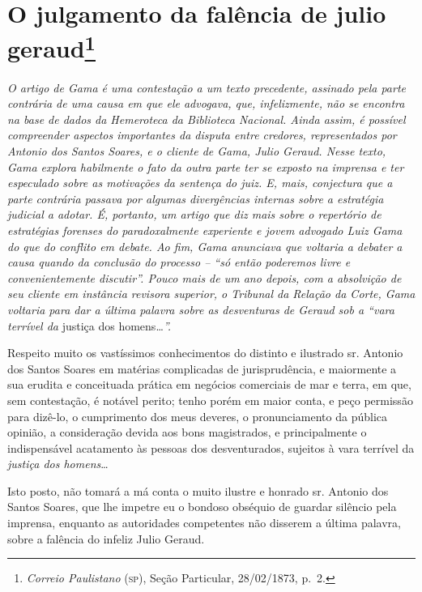 \chapter{O julgamento da falência de julio geraud\footnote{\emph{Correio Paulistano} (\textsc{sp}), Seção Particular,
  28/02/1873, p.~2.}} %

\begin{didascalia}
\emph{O artigo de Gama é uma contestação a um texto precedente, assinado
pela parte contrária de uma causa em que ele advogava, que,
infelizmente, não se encontra na base de dados da Hemeroteca da
Biblioteca Nacional. Ainda assim, é possível compreender aspectos
importantes da disputa entre credores, representados por Antonio dos
Santos Soares, e o cliente de Gama, Julio Geraud. Nesse texto, Gama
explora habilmente o fato da outra parte ter se exposto na imprensa e
ter especulado sobre as motivações da sentença do juiz. E, mais,
conjectura que a parte contrária passava por algumas divergências
internas sobre a estratégia judicial a adotar. É, portanto, um artigo
que diz mais sobre o repertório de estratégias forenses do
paradoxalmente experiente e jovem advogado Luiz Gama do que do conflito
em debate. Ao fim, Gama anunciava que voltaria a debater a causa quando
da conclusão do processo -- ``só então poderemos livre e convenientemente
discutir''. Pouco mais de um ano depois, com a absolvição de seu cliente
em instância revisora superior, o Tribunal da Relação da Corte, Gama
voltaria para dar a última palavra sobre as desventuras de Geraud sob a
``vara terrível da} justiça dos homens\ldots{}\emph{''.}
\end{didascalia}

Respeito muito os vastíssimos conhecimentos do distinto e ilustrado sr.
Antonio dos Santos Soares em matérias complicadas de jurisprudência, e
maiormente a sua erudita e conceituada prática em negócios comerciais de
mar e terra, em que, sem contestação, é notável perito; tenho porém em
maior conta, e peço permissão para dizê-lo, o cumprimento dos meus
deveres, o pronunciamento da pública opinião, a consideração devida aos
bons magistrados, e principalmente o indispensável acatamento às pessoas
dos desventurados, sujeitos à vara terrível da \emph{justiça dos
homens}\ldots{}

Isto posto, não tomará a má conta o muito ilustre e honrado sr. Antonio
dos Santos Soares, que lhe impetre eu o bondoso obséquio de guardar
silêncio pela imprensa, enquanto as autoridades competentes não disserem
a última palavra, sobre a falência do infeliz Julio Geraud.

